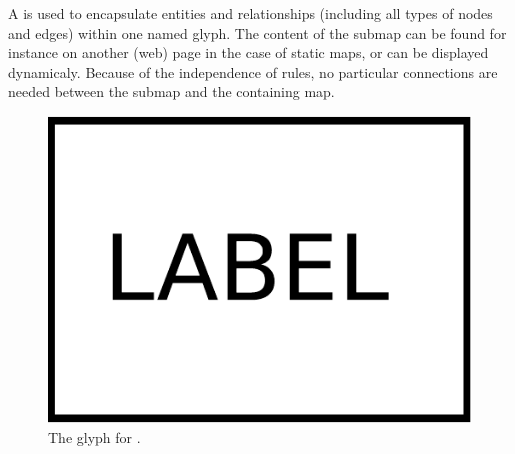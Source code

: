 
\color{red}

A  is used to encapsulate entities and relationships (including all types of nodes and edges) within one named glyph. The content of the submap can be found for instance on another (web) page in the case of static maps, or can be displayed dynamicaly. Because of the independence of rules, no particular connections are needed between the submap and the containing map.

\begin{figure}[H]
  \centering
  \includegraphics[scale = 0.3]{images/submap}
  \caption{The \ER glyph for .}
  \label{fig:submap}
\end{figure}


\normalcolor
